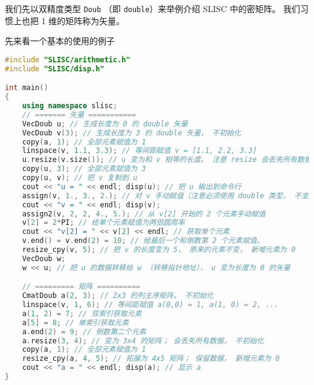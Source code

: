 
\begin{issues}
\issueDraft
\end{issues}


我们先以双精度类型 \verb|Doub| （即 \verb|double|）来举例介绍 SLISC 中的密矩阵。 我们习惯上也把 1 维的矩阵称为矢量。

先来看一个基本的使用的例子
\begin{lstlisting}[language=cpp]
#include "SLISC/arithmetic.h"
#include "SLISC/disp.h"

int main()
{
    using namespace slisc;
    // ======= 矢量 ===========
    VecDoub u; // 生成长度为 0 的 double 矢量
    VecDoub v(3); // 生成长度为 3 的 double 矢量， 不初始化
    copy(a, 1); // 全部元素赋值为 1
    linspace(v, 1.1, 3.3); // 等间距赋值 v = [1.1, 2.2, 3.3]
    u.resize(v.size()); // u 变为和 v 相等的长度。 注意 resize 会丢失所有数据
    copy(u, 3); // 全部元素赋值为 3
    copy(u, v); // 把 v 复制到 u
    cout << "u = " << endl; disp(u); // 把 u 输出到命令行
    assign(v, 1., 3., 2.); // 对 v 手动赋值（注意必须使用 double 类型， 不支持自动转换）
    cout << "v = " << endl; disp(v);
    assign2(v, 2, 2, 4., 5.); // 从 v[2] 开始的 2 个元素手动赋值
    v[2] = 2*PI; // 给单个元素赋值为两倍圆周率
    cout << "v[2] = " << v[2] << endl; // 获取单个元素
    v.end() = v.end(2) = 10; // 给最后一个和倒数第 2 个元素赋值。
    resize_cpy(v, 5); // 把 v 的长度变为 5， 原来的元素不变， 新增元素为 0
    VecDoub w;
    w << u; // 把 u 的数据转移给 w （转移指针地址）， u 变为长度为 0 的矢量

    // ========= 矩阵 ==========
    CmatDoub a(2, 3); // 2x3 的列主序矩阵， 不初始化
    linspace(v, 1, 6); // 等间距赋值 a(0,0) = 1, a(1, 0) = 2, ...
    a(1, 2) = 7; // 双索引获取元素
    a[5] = 8; // 单索引获取元素
    a.end(2) = 9; // 倒数第二个元素
    a.resize(3, 4); // 变为 3x4 的矩阵； 会丢失所有数据， 不初始化
    copy(a, 1); // 全部元素赋值为 1
    resize_cpy(a, 4, 5); // 拓展为 4x5 矩阵； 保留数据， 新增元素为 0
    cout << "a = " << endl; disp(a); // 显示 a
}
\end{lstlisting}

